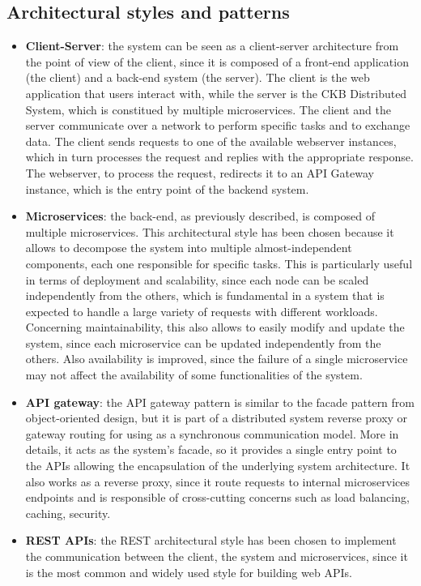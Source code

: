 \subsection{Architectural styles and patterns}
\begin{itemize}
    \item \textbf{Client-Server}: the system can be seen as a client-server architecture from the point of view of the client, since it is composed of a front-end application (the client) and a back-end system (the server). The client is the web application that users interact with, while the server is the CKB Distributed System, which is constitued by multiple microservices. 
    The client and the server communicate over a network to perform specific tasks and to exchange data. The client sends requests to one of the available webserver instances, which in turn processes the request and replies with the appropriate response.
    The webserver, to process the request, redirects it to an API Gateway instance, which is the entry point of the backend system.
    \item \textbf{Microservices}: the back-end, as previously described, is composed of multiple microservices. This architectural style has been chosen because it allows to decompose the system into multiple almost-independent components, each one responsible for specific tasks.
    This is particularly useful in terms of deployment and scalability, since each node can be scaled independently from the others, which is fundamental in a system that is expected to handle a large variety of requests with different workloads.
    Concerning maintainability, this also allows to easily modify and update the system, since each microservice can be updated independently from the others.
    Also availability is improved, since the failure of a single microservice may not affect the availability of some functionalities of the system.
    \item \textbf{API gateway}: the API gateway pattern is similar to the facade pattern from object-oriented design, but it is part of a distributed system reverse proxy or gateway routing for using as a synchronous communication model.
    More in details, it acts as the system's facade, so it provides a single entry point to the APIs allowing the encapsulation of the underlying system architecture.
    It also works as a reverse proxy, since it route requests to internal microservices endpoints and is responsible of cross-cutting concerns such as load balancing, caching, security.
    \item \textbf{REST APIs}: the REST architectural style has been chosen to implement the communication between the client, the system and microservices, since it is the most common and widely used style for building web APIs.

\end{itemize}
